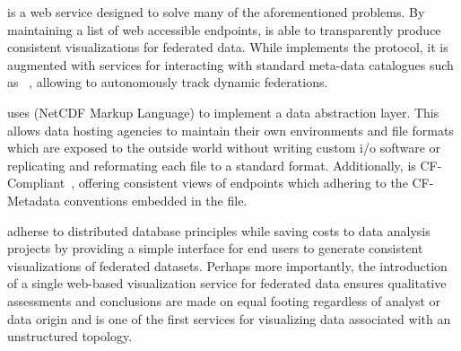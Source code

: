 \sciwms{} is a web service designed to solve many of the
aforementioned problems. By maintaining a list of web accessible
endpoints, \sciwms{} is able to transparently produce consistent
visualizations for federated data. While \sciwms{} implements the
\ogc{} \wms{} protocol, it is augmented with services for interacting
with standard meta-data catalogues such as \csw{}~\cite{csw14},
allowing \sciwms{} to autonomously track dynamic federations.

\sciwms{} uses \ncml{} (NetCDF Markup Language) to implement a data
abstraction layer. This allows data hosting agencies to maintain their
own environments and file formats which are exposed to the outside
world without writing custom i/o software or replicating and
reformating each file to a standard format. Additionally, \sciwms{} is
CF-Compliant~\cite{cf}, offering consistent views of endpoints which
adhering to the CF-Metadata conventions embedded in the \ncml{} file.

\sciwms{} adherse to distributed database principles while
saving costs to data analysis projects by providing a simple interface
for end users to generate consistent visualizations of federated
datasets. Perhaps more importantly, the introduction of a single
web-based visualization service for federated data ensures qualitative
assessments and conclusions are made on equal footing regardless of
analyst or data origin and is one of the first services for
visualizing data associated with an unstructured topology.
